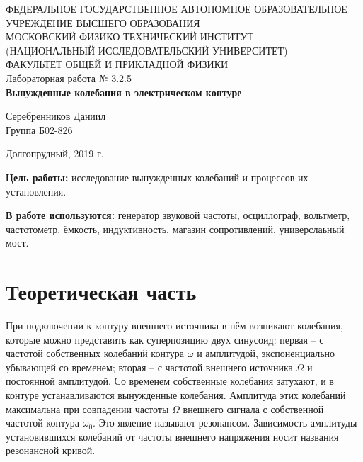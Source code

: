 \documentclass[a4paper,12pt]{article} %
\begin{document}
	\begin{center}
		\footnotesize{ФЕДЕРАЛЬНОЕ ГОСУДАРСТВЕННОЕ АВТОНОМНОЕ ОБРАЗОВАТЕЛЬНОЕ 			УЧРЕЖДЕНИЕ ВЫСШЕГО ОБРАЗОВАНИЯ}\\
		\footnotesize{МОСКОВСКИЙ ФИЗИКО-ТЕХНИЧЕСКИЙ ИНСТИТУТ\\(НАЦИОНАЛЬНЫЙ 			ИССЛЕДОВАТЕЛЬСКИЙ УНИВЕРСИТЕТ)}\\
		\footnotesize{ФАКУЛЬТЕТ ОБЩЕЙ И ПРИКЛАДНОЙ ФИЗИКИ\\}
		\hfill \break
		\hfill\break
		\hfill\break
		\hfill \break
		\hfill \break
		\hfill \break
		\hfill \break
		\hfill \break
		\hfill \break
		\hfill \break
		\hfill \break
		\hfill \break
		\hfill \break
		\hfill \break
		\large{Лабораторная работа № 3.2.5\\\textbf{Вынужденные колебания в электрическом контуре}}\\
		\hfill \break
		\hfill \break
		\hfill \break
		\begin{flushright}
			Серебренников Даниил\\
			Группа Б02-826
		\end{flushright}
		\hfill \break
		\hfill \break
		\hfill \break
		\hfill \break
		\hfill \break
	\end{center}
	\hfill \break
	\hfill \break
	\hfill \break
	\hfill \break
	\hfill \break
	\hfill \break
	\begin{center}
		Долгопрудный, 2019 г.
	\end{center}
	\thispagestyle{empty}
	\newpage
	
	\textbf{Цель работы:} исследование вынужденных колебаний и процессов их установления.
	
	\textbf{В работе используются:} генератор звуковой частоты, осциллограф, вольтметр, частотометр, ёмкость, индуктивность, магазин сопротивлений, универслаьный мост.
	
	
\section{Теоретическая часть}
	При подключении к контуру внешнего источника в нём возникают колебания, которые можно представить как суперпозицию двух синусоид: первая -- с частотой собственных колебаний контура $\omega$ и амплитудой, экспоненциально убывающей со временем; вторая -- с частотой внешнего источника $\Omega$ и постоянной амплитудой. Со временем собственные колебания затухают, и в контуре устанавливаются вынужденные колебания. Амплитуда этих колебаний максимальна при совпадении частоты $\Omega$ внешнего сигнала с собственной частотой контура $\omega_0$. Это явление называют резонансом. Зависимость амплитуды установившихся колебаний от частоты внешнего напряжения носит названия резонансной кривой.	
\end{document}
